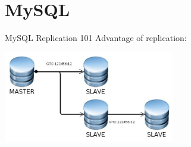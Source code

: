 \documentclass{beamer}[10]
\begin{document}
%
%
\section{MySQL}
\begin{pyframe}{MySQL Replication 101}
Advantage of replication:
\includegraphics[height=4cm]{images/mysql-propagate-gtid.jpg}
\end{pyframe}

\end{document}
